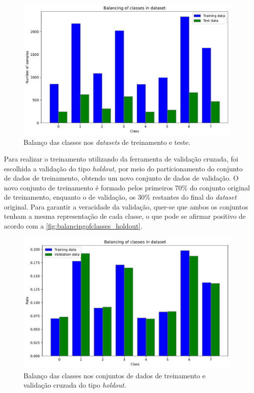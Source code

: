 \begin{figure}[H]
	\centering
	\includegraphics[width=0.75\linewidth]{../../plot/Balancing_of_classes}
	\caption{Balanço das classes nos \textit{datasets} de treinamento e teste.}
	\label{fig:balancingofclasses}
\end{figure}

Para realizar o treinamento utilizando da ferramenta de validação cruzada, foi escolhida a validação do tipo \textit{holdout}, por meio do particionamento do conjunto de dados de treinamento, obtendo um novo conjunto de dados de validação. O novo conjunto de treinamento é formado pelos primeiros 70\% do conjunto original de treinamento, enquanto o de validação, os 30\% restantes do final do \textit{dataset} original. Para garantir a veracidade da validação, quer-se que ambos os conjuntos tenham a mesma representação de cada classe, o que pode se afirmar positivo de acordo com a \autoref{fig:balancingofclasses_holdout}.

\begin{figure}[H]
\centering
\includegraphics[width=0.75\linewidth]{../../plot/Balancing_of_classes_holdout}
\caption{Balanço das classes nos conjuntos de dados de treinamento e validação cruzada do tipo \textit{holdout}.}
\label{fig:balancingofclasses_holdout}
\end{figure}


